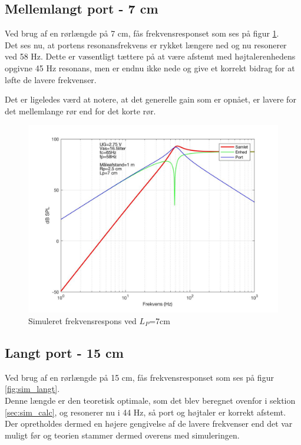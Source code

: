 \subsection{Mellemlangt port - 7 cm}

Ved brug af en rørlængde på 7 cm, fås frekvensresponset som ses på figur \ref{fig:sim_medium}. \\
Det ses nu, at portens resonansfrekvens er rykket længere ned og nu resonerer ved 58 Hz. Dette er væsentligt tættere på at være afstemt med højtalerenhedens opgivne 45 Hz resonans, men er endnu ikke nede og give et korrekt bidrag for at løfte de lavere frekvenser. 

Det er ligeledes værd at notere, at det generelle gain som er opnået, er lavere for det mellemlange rør end for det korte rør.  

\begin{figure}[h!]
	\centering
	\includegraphics[width=.8\textwidth]{Pics/sim_medium}
	\caption{Simuleret frekvensrespons ved $L_P$=7cm } 
	\label{fig:sim_medium}
\end{figure}

\subsection{Langt port - 15 cm}

Ved brug af en rørlængde på 15 cm, fås frekvensresponset som ses på figur \ref{fig:sim_langt}. \\
Denne længde er den teoretisk optimale, som det blev beregnet ovenfor i sektion \ref{sec:sim_calc}, og resonerer nu i 44 Hz, så port og højtaler er korrekt afstemt. 
Der opretholdes dermed en højere gengivelse af de lavere frekvenser end det var muligt før og teorien stammer dermed overens med simuleringen. 

